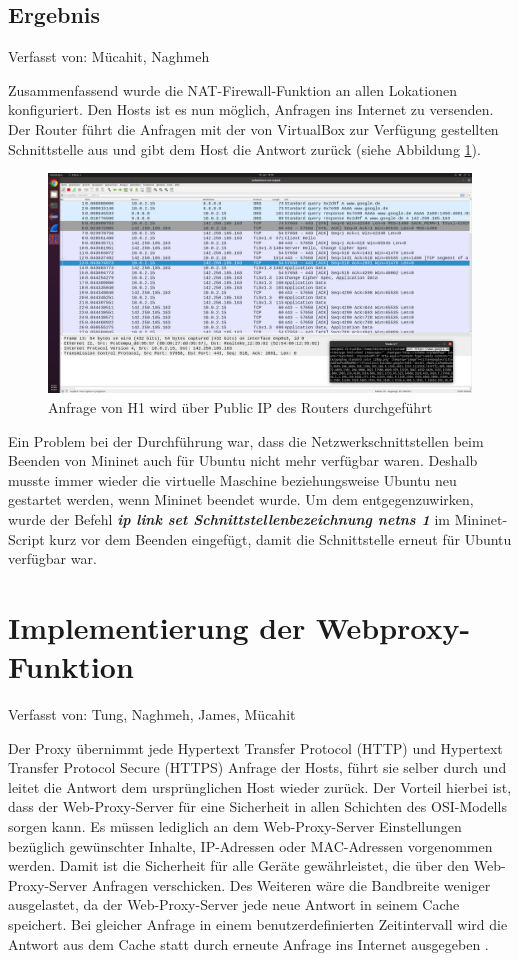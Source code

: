 \documentclass[fontsize=12pt,paper=a4,open=any,parskip=half,
  twoside=false,toc=listof,toc=bibliography,fleqn,leqno,
  captions=nooneline,captions=tableabove,british]{scrbook}
\begin{document}
\subsection{Ergebnis}
{\tiny Verfasst von: Mücahit, Naghmeh\par}
Zusammenfassend wurde die NAT-Firewall-Funktion an allen Lokationen konfiguriert. Den Hosts ist es nun möglich, Anfragen ins Internet zu versenden. Der Router führt die Anfragen mit der von VirtualBox zur Verfügung gestellten Schnittstelle aus und gibt dem Host die Antwort zurück (siehe Abbildung \ref{nat}).

\begin{figure}[H]
 \centering
 \includegraphics[width=1.0\textwidth]{Bilder/nat}
 \captionsetup{justification=centering}
 \caption{Anfrage von H1 wird über Public IP des Routers durchgeführt}
 \label{nat}
\end{figure}

Ein Problem bei der Durchführung war, dass die Netzwerkschnittstellen beim Beenden von Mininet auch für Ubuntu nicht mehr verfügbar waren. Deshalb musste immer wieder die virtuelle Maschine beziehungsweise Ubuntu neu gestartet werden, wenn Mininet beendet wurde. Um dem entgegenzuwirken, wurde der Befehl \textit{\textbf{ip link set Schnittstellenbezeichnung netns 1}} im Mininet-Script kurz vor dem Beenden eingefügt, damit die Schnittstelle erneut für Ubuntu verfügbar war.

\newpage
\section{Implementierung der Webproxy-Funktion}
{\tiny Verfasst von: Tung, Naghmeh, James, Mücahit\par}
Der Proxy übernimmt jede Hypertext Transfer Protocol (HTTP) und Hypertext Transfer Protocol Secure (HTTPS) Anfrage der Hosts, führt sie selber durch und leitet die Antwort dem ursprünglichen Host wieder zurück. Der Vorteil hierbei ist, dass der Web-Proxy-Server für eine Sicherheit in allen Schichten des OSI-Modells sorgen kann. Es müssen lediglich an dem Web-Proxy-Server Einstellungen bezüglich gewünschter Inhalte, IP-Adressen oder MAC-Adressen vorgenommen werden. Damit ist die Sicherheit für alle Geräte gewährleistet, die über den Web-Proxy-Server Anfragen verschicken. Des Weiteren wäre die Bandbreite weniger ausgelastet, da der Web-Proxy-Server jede neue Antwort in seinem Cache speichert. Bei gleicher Anfrage in einem benutzerdefinierten Zeitintervall wird die Antwort aus dem Cache statt durch erneute Anfrage ins Internet ausgegeben \cite{webproxyosi}.
\end{document}
